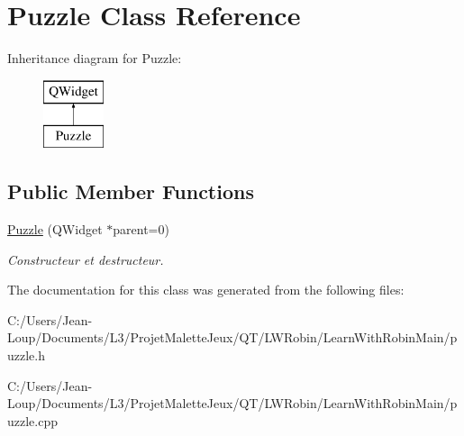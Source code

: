 \hypertarget{class_puzzle}{}\section{Puzzle Class Reference}
\label{class_puzzle}
Inheritance diagram for Puzzle\+:\begin{figure}[H]
\begin{center}
\leavevmode
\includegraphics[height=2.000000cm]{class_puzzle}
\end{center}
\end{figure}
\subsection*{Public Member Functions}
\begin{DoxyCompactItemize}
\item 
\mbox{\label{class_puzzle_a9781d5d1803efc344bc3d9c13f2451dc}} 
\hyperlink{class_puzzle_a9781d5d1803efc344bc3d9c13f2451dc}{Puzzle} (Q\+Widget $\ast$parent=0)
\begin{DoxyCompactList}\small\item\em Constructeur et destructeur. \end{DoxyCompactList}\end{DoxyCompactItemize}


The documentation for this class was generated from the following files\+:\begin{DoxyCompactItemize}
\item 
C\+:/\+Users/\+Jean-\/\+Loup/\+Documents/\+L3/\+Projet\+Malette\+Jeux/\+Q\+T/\+L\+W\+Robin/\+Learn\+With\+Robin\+Main/puzzle.\+h\item 
C\+:/\+Users/\+Jean-\/\+Loup/\+Documents/\+L3/\+Projet\+Malette\+Jeux/\+Q\+T/\+L\+W\+Robin/\+Learn\+With\+Robin\+Main/puzzle.\+cpp\end{DoxyCompactItemize}
